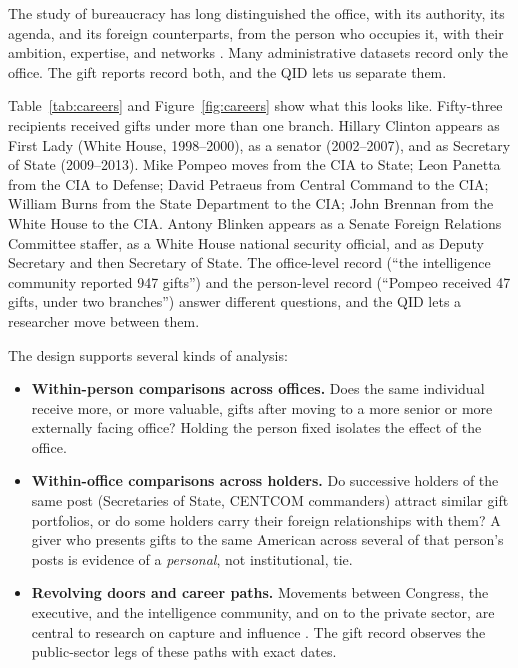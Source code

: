 \documentclass[11pt]{article}
\begin{document}
The study of bureaucracy has long distinguished the office, with its authority, its agenda, and its foreign counterparts, from the person who occupies it, with their ambition, expertise, and networks \citep{gailmard2007slackers,lewis2008politics,teodoro2011bureaucratic}. Many administrative datasets record only the office. The gift reports record both, and the QID lets us separate them.

Table~\ref{tab:careers} and Figure~\ref{fig:careers} show what this looks like. Fifty-three recipients received gifts under more than one branch. Hillary Clinton appears as First Lady (White House, 1998--2000), as a senator (2002--2007), and as Secretary of State (2009--2013). Mike Pompeo moves from the CIA to State; Leon Panetta from the CIA to Defense; David Petraeus from Central Command to the CIA; William Burns from the State Department to the CIA; John Brennan from the White House to the CIA. Antony Blinken appears as a Senate Foreign Relations Committee staffer, as a White House national security official, and as Deputy Secretary and then Secretary of State. The office-level record (``the intelligence community reported 947 gifts'') and the person-level record (``Pompeo received 47 gifts, under two branches'') answer different questions, and the QID lets a researcher move between them.

The design supports several kinds of analysis:
\begin{itemize}
\item \textbf{Within-person comparisons across offices.} Does the same individual receive more, or more valuable, gifts after moving to a more senior or more externally facing office? Holding the person fixed isolates the effect of the office.
\item \textbf{Within-office comparisons across holders.} Do successive holders of the same post (Secretaries of State, CENTCOM commanders) attract similar gift portfolios, or do some holders carry their foreign relationships with them? A giver who presents gifts to the same American across several of that person's posts is evidence of a \emph{personal}, not institutional, tie.
\item \textbf{Revolving doors and career paths.} Movements between Congress, the executive, and the intelligence community, and on to the private sector, are central to research on capture and influence \citep{dalbo2006regulatory,blanes2012revolving}. The gift record observes the public-sector legs of these paths with exact dates.
\end{itemize}
\end{document}
